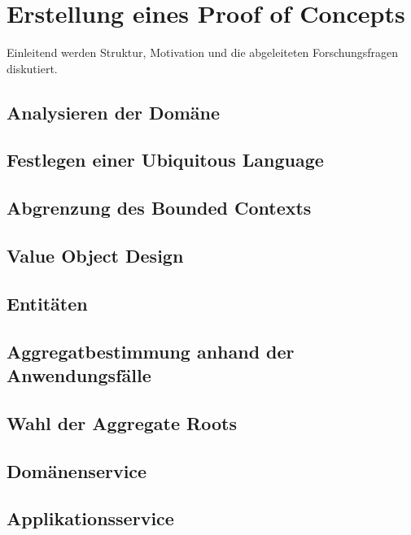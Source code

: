 

\chapter{Erstellung eines Proof of Concepts}

Einleitend werden Struktur, Motivation und die abgeleiteten Forschungsfragen diskutiert.

\section{Analysieren der Domäne}
\blindtext

\section{Festlegen einer Ubiquitous Language}
\blindtext

\section{Abgrenzung des Bounded Contexts}
\blindtext

\section{Value Object Design}
\blindtext

\section{Entitäten}
\blindtext

\section{Aggregatbestimmung anhand der Anwendungsfälle}
\blindtext

\section{Wahl der Aggregate Roots}
\blindtext

\section{Domänenservice}
\blindtext

\section{Applikationsservice}
\blindtext